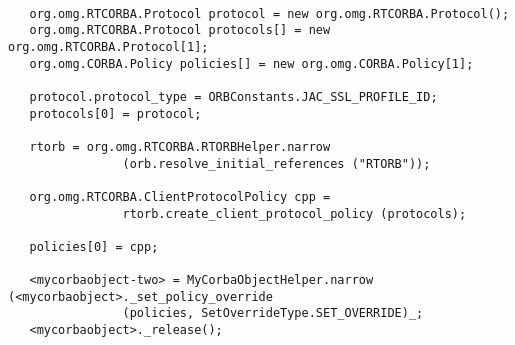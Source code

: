 \begin{samepage}
\begin{small}
\begin{verbatim}

   org.omg.RTCORBA.Protocol protocol = new org.omg.RTCORBA.Protocol();
   org.omg.RTCORBA.Protocol protocols[] = new org.omg.RTCORBA.Protocol[1];
   org.omg.CORBA.Policy policies[] = new org.omg.CORBA.Policy[1];

   protocol.protocol_type = ORBConstants.JAC_SSL_PROFILE_ID;
   protocols[0] = protocol;

   rtorb = org.omg.RTCORBA.RTORBHelper.narrow
                (orb.resolve_initial_references ("RTORB"));

   org.omg.RTCORBA.ClientProtocolPolicy cpp =
                rtorb.create_client_protocol_policy (protocols);

   policies[0] = cpp;

   <mycorbaobject-two> = MyCorbaObjectHelper.narrow (<mycorbaobject>._set_policy_override
                (policies, SetOverrideType.SET_OVERRIDE)_;
   <mycorbaobject>._release();
\end{verbatim}
\end{small}
\end{samepage}



